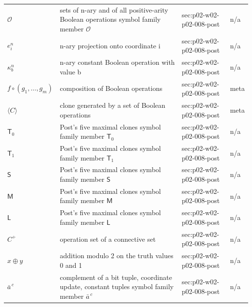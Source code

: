 \begin{longtable}{@{}p{}p{}p{}p{}@{}}
\(\mathcal O\) & sets of n-ary and of all positive-arity Boolean operations symbol family member \(\mathcal O\) & sec:\allowbreak{}p02-\allowbreak{}w02-\allowbreak{}p02-\allowbreak{}008-\allowbreak{}post & n/a \\
\(e^n_i\) & n-ary projection onto coordinate i & sec:\allowbreak{}p02-\allowbreak{}w02-\allowbreak{}p02-\allowbreak{}008-\allowbreak{}post & n/a \\
\(\kappa^n_b\) & n-ary constant Boolean operation with value b & sec:\allowbreak{}p02-\allowbreak{}w02-\allowbreak{}p02-\allowbreak{}008-\allowbreak{}post & n/a \\
\(f\circ(g_1,\allowbreak \ldots,\allowbreak g_m)\) & composition of Boolean operations & sec:\allowbreak{}p02-\allowbreak{}w02-\allowbreak{}p02-\allowbreak{}008-\allowbreak{}post & meta \\
\(\langle C\rangle\) & clone generated by a set of Boolean operations & sec:\allowbreak{}p02-\allowbreak{}w02-\allowbreak{}p02-\allowbreak{}008-\allowbreak{}post & meta \\
\(\mathsf T_0\) & Post's five maximal clones symbol family member \(\mathsf T_0\) & sec:\allowbreak{}p02-\allowbreak{}w02-\allowbreak{}p02-\allowbreak{}008-\allowbreak{}post & n/a \\
\(\mathsf T_1\) & Post's five maximal clones symbol family member \(\mathsf T_1\) & sec:\allowbreak{}p02-\allowbreak{}w02-\allowbreak{}p02-\allowbreak{}008-\allowbreak{}post & n/a \\
\(\mathsf S\) & Post's five maximal clones symbol family member \(\mathsf S\) & sec:\allowbreak{}p02-\allowbreak{}w02-\allowbreak{}p02-\allowbreak{}008-\allowbreak{}post & n/a \\
\(\mathsf M\) & Post's five maximal clones symbol family member \(\mathsf M\) & sec:\allowbreak{}p02-\allowbreak{}w02-\allowbreak{}p02-\allowbreak{}008-\allowbreak{}post & n/a \\
\(\mathsf L\) & Post's five maximal clones symbol family member \(\mathsf L\) & sec:\allowbreak{}p02-\allowbreak{}w02-\allowbreak{}p02-\allowbreak{}008-\allowbreak{}post & n/a \\
\(C^+\) & operation set of a connective set & sec:\allowbreak{}p02-\allowbreak{}w02-\allowbreak{}p02-\allowbreak{}008-\allowbreak{}post & n/a \\
\(x\oplus y\) & addition modulo 2 on the truth values 0 and 1 & sec:\allowbreak{}p02-\allowbreak{}w02-\allowbreak{}p02-\allowbreak{}008-\allowbreak{}post & n/a \\
\(\bar a^{\,c}\) & complement of a bit tuple, coordinate update, constant tuples symbol family member \(\bar a^{\,c}\) & sec:\allowbreak{}p02-\allowbreak{}w02-\allowbreak{}p02-\allowbreak{}008-\allowbreak{}post & n/a \\

\end{longtable}

